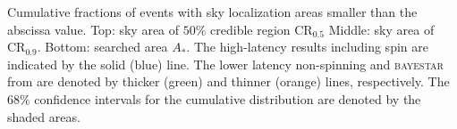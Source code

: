 \label{fig:sky} Cumulative fractions of events with sky localization areas smaller than the abscissa value. Top: sky area of $50\%$ credible region $\mathrm{CR}_{0.5}$ Middle: sky area of $\mathrm{CR}_{0.9}$. Bottom: searched area $A_\ast$. The high-latency results including spin are indicated by the solid (blue) line. The lower latency non-spinning and \textsc{bayestar} from \citet{Singer_2014} are denoted by thicker (green) and thinner (orange) lines, respectively. The $68\%$ confidence intervals for the cumulative distribution are denoted by the shaded areas.
  